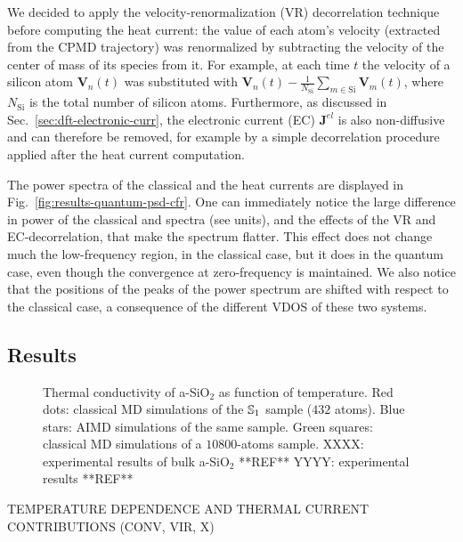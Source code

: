 We decided to apply the velocity-renormalization (VR) decorrelation technique before computing the heat current: the value of each atom's velocity (extracted from the CPMD trajectory) was renormalized by subtracting the velocity of the center of mass of its species from it. 
For example, at each time $t$ the velocity of a silicon atom $\mathbf{V}_n(t)$ was substituted with $\mathbf{V}_n(t)-\frac{1}{N_\mathrm{Si}}\sum_{m\in \mathrm{Si}}\mathbf{V}_m(t)$, where $N_\mathrm{Si}$ is the total number of silicon atoms. 
Furthermore, as discussed in Sec.~\ref{sec:dft-electronic-curr}, the electronic current (EC) $\mathbf{J}^{el}$ is also non-diffusive and can therefore be removed, for example by a simple decorrelation procedure applied after the heat current computation. 

The power spectra of the classical and the \abinitio heat currents are displayed in Fig.~\ref{fig:results-quantum-psd-cfr}. One can immediately notice the large difference in power of the classical and \abinitio spectra (see units), and the effects of the VR and EC-decorrelation, that make the spectrum flatter. This effect does not change much the low-frequency region, in the classical case, but it does in the quantum case, even though the convergence at zero-frequency is maintained. 
We also notice that the positions of the peaks of the \abinitio power spectrum are shifted with respect to the classical case, a consequence of the different VDOS of these two systems. 


\subsection{Results}  \label{sec:results-quantum-results}


\begin{figure}
    \centering
    \caption{Thermal conductivity of a-SiO$_2$ as function of temperature. 
    Red dots: classical MD simulations of the $\S1$ sample ($432$ atoms). 
    Blue stars: AIMD simulations of the same sample. 
    Green squares: classical MD simulations of a $10800$-atoms sample. 
    XXXX: experimental results of bulk a-SiO$_2$ **REF**
    YYYY: experimental results **REF**
    }
    \label{fig:results-quantum-kappa-temp}
\end{figure}

TEMPERATURE DEPENDENCE
AND THERMAL CURRENT CONTRIBUTIONS (CONV, VIR, X)
